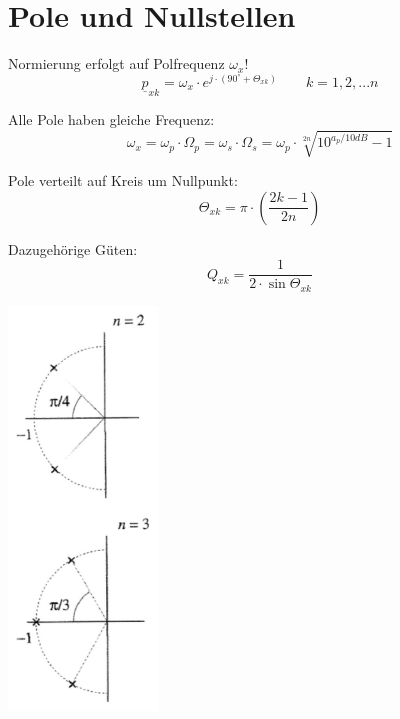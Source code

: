 \documentclass[a4paper, 12pt]{report}
\begin{document}
\section*{Pole und Nullstellen}
	\begin{minipage}[t]{0.6\textwidth}
		\vspace{-5cm}
	    Normierung erfolgt auf Polfrequenz $ \omega_x $!
	    \[ \underline{p}_{xk} = \omega_x \cdot e^{j \cdot (90^{\circ} + \varTheta_{xk})} \qquad k = 1, 2, ... n \]
	    
	    Alle Pole haben gleiche Frequenz:
	    \[ \omega_x = \omega_p \cdot \Omega_p = \omega_s \cdot \Omega_s = \omega_p \cdot \sqrt[2n]{10^{a_p / 10dB} - 1} \]
	    
	    Pole verteilt auf Kreis um Nullpunkt:
	    \[ \varTheta_{xk} = \pi \cdot \left( \frac{2k-1}{2n} \right)  \]
	    
	    Dazugehörige Güten:
	    \[ Q_{xk} = \frac{1}{2 \cdot \sin{\varTheta_{xk}}} \]
	\end{minipage}
   	\begin{minipage}[h]{0.9\textwidth}
   		\vspace{-1cm}
   		\hspace{1cm}
   		\includegraphics[width=0.3\textwidth]{images/butterworth-pole.png}
   	\end{minipage}
   	
   	
\clearpage
   	
\end{document}
